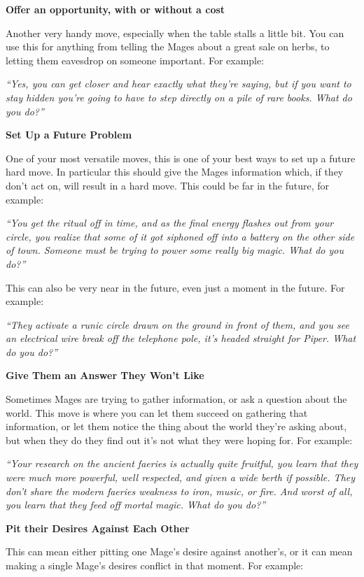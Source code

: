 \documentclass[
  oneside,
  statementpaper,
  9pt]{memoir}
\begin{document}
\textbf{Offer an opportunity, with or without a cost}

Another very handy move, especially when the table stalls a little bit.
You can use this for anything from telling the Mages about a great sale
on herbs, to letting them eavesdrop on someone important. For example:

\emph{``Yes, you can get closer and hear exactly what they're saying,
but if you want to stay hidden you're going to have to step directly on
a pile of rare books. What do you do?''}

\textbf{Set Up a Future Problem}

One of your most versatile moves, this is one of your best ways to set
up a future hard move. In particular this should give the Mages
information which, if they don't act on, will result in a hard move.
This could be far in the future, for example:

\emph{``You get the ritual off in time, and as the final energy flashes
out from your circle, you realize that some of it got siphoned off into
a battery on the other side of town. Someone must be trying to power
some really big magic. What do you do?''}

This can also be very near in the future, even just a moment in the
future. For example:

\emph{``They activate a runic circle drawn on the ground in front of
them, and you see an electrical wire break off the telephone pole, it's
headed straight for Piper. What do you do?''}

\textbf{Give Them an Answer They Won't Like}

Sometimes Mages are trying to gather information, or ask a question
about the world. This move is where you can let them succeed on
gathering that information, or let them notice the thing about the world
they're asking about, but when they do they find out it's not what they
were hoping for. For example:

\emph{``Your research on the ancient faeries is actually quite fruitful,
you learn that they were much more powerful, well respected, and given a
wide berth if possible. They don't share the modern faeries weakness to
iron, music, or fire. And worst of all, you learn that they feed off
mortal magic. What do you do?''}

\textbf{Pit their Desires Against Each Other}

This can mean either pitting one Mage's desire against another's, or it
can mean making a single Mage's desires conflict in that moment. For
example:
\end{document}
